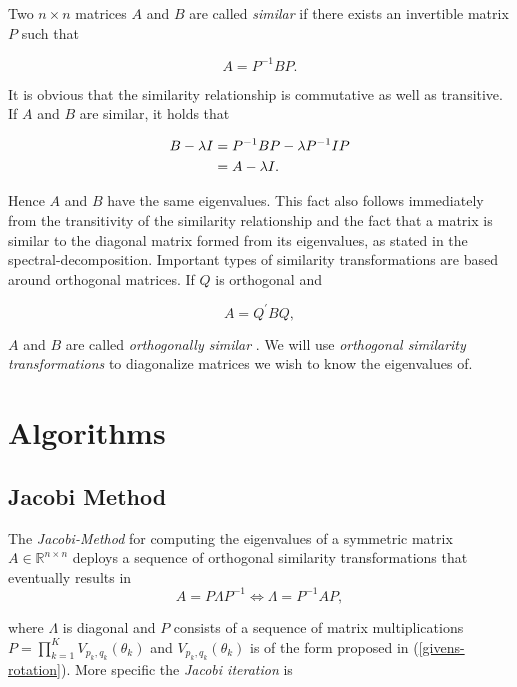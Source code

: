 \documentclass[12pt]{article}
\begin{document}
Two $n \times n$ matrices $A$ and $B$ are called \textit{similar} if there exists an invertible matrix $P$ such that

\begin{equation}
\label{similarity}
A = P^{-1} B P.
\end{equation}

It is obvious that the similarity relationship is commutative as well as transitive. If $A$ and $B$ are similar, it holds that

\begin{align*}
B - \lambda I &= P^{-1} B P - \lambda P^{-1} I P \notag \\
              &= A - \lambda I.
\end{align*}

 Hence $A$ and $B$ have the same eigenvalues. This fact also follows immediately from the transitivity of the similarity relationship and the fact that a matrix is similar to the diagonal matrix formed from its eigenvalues, as stated in the spectral-decomposition. Important types of similarity transformations are based around orthogonal matrices. If $Q$ is orthogonal and
 
$$ A = Q^{\prime} B Q, $$

$A$ and $B$ are called \textit{orthogonally similar} \cite{NLA}. We will use \textit{orthogonal similarity transformations} to diagonalize matrices we wish to know the eigenvalues of. 

\section{Algorithms}
\subsection{Jacobi Method}

The \textit{Jacobi-Method} for computing the eigenvalues of a symmetric matrix $A \in \mathbb{R}^{n \times n}$ deploys a sequence of orthogonal similarity transformations that eventually results in
$$ A = P \Lambda P^{-1} \Leftrightarrow \Lambda = P^{-1} A P,$$

where $\Lambda$ is diagonal and $P$ consists of a sequence of matrix multiplications $P = \prod\limits_{k=1}^{K} V_{p_k, q_k}(\theta_k)$ and $V_{p_k, q_k}(\theta_k)$ is of the form proposed in (\ref{givens-rotation}). More specific the \textit{Jacobi iteration} is
\end{document}
